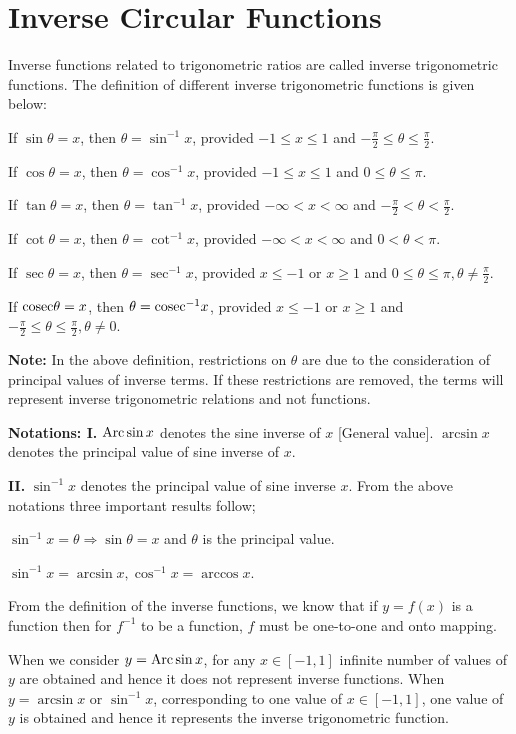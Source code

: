 \chapter{Inverse Circular Functions}
Inverse functions related to trigonometric ratios are called inverse trigonometric functions. The definition of different
inverse trigonometric functions is given below:

If $\sin\theta = x$, then $\theta = \sin^{-1}x$, provided $-1\leq x\leq 1$ and $-\frac{\pi}{2}\leq\theta\leq\frac{\pi}{2}$.

If $\cos\theta = x$, then $\theta = \cos^{-1}x$, provided $-1\leq x\leq 1$ and $0\leq\theta\leq\pi$.

If $\tan\theta = x$, then $\theta = \tan^{-1}x$, provided $-\infty<x<\infty$ and $-\frac{\pi}{2}<\theta<\frac{\pi}{2}$.

If $\cot\theta = x$, then $\theta = \cot^{-1}x$, provided $-\infty<x<\infty$ and $0<\theta<\pi$.

If $\sec\theta = x$, then $\theta = \sec^{-1}x$, provided $x\leq -1$ or $x\geq 1$ and $0\leq \theta\leq
\pi,\theta\neq\frac{\pi}{2}$.

If ${\rm cosec}\theta = x$, then $\theta = {\rm cosec}^{-1}x$, provided $x\leq -1$ or $x\geq 1$ and $-\frac{\pi}{2}\leq\theta\leq
\frac{\pi}{2}, \theta\neq0$.

{\bf Note:} In the above definition, restrictions on $\theta$ are due to the consideration of principal values of inverse
terms. If these restrictions are removed, the terms will represent inverse trigonometric relations and not functions.

{\bf Notations: I.} ${\rm Arc}\sin x$ denotes the sine inverse of $x$ [General value]. $\arcsin x$ denotes the principal value
of sine inverse of $x$.

{\bf II.} $\sin^{-1}x$ denotes the principal value of sine inverse $x$. From the above notations three important results follow;
\startitemize[n]
\item $\sin^{-1}x = \theta \Rightarrow \sin\theta = x$ and $\theta$ is the principal value.
\item $\sin^{-1}x = \arcsin x, \cos^{-1}x = \arccos x$.
\item From the definition of the inverse functions, we know that if $y = f(x)$ is a function then for $f^{-1}$ to be a function,
  $f$ must be one-to-one and onto mapping.
\stopitemize

When we consider $y = {\rm Arc}\sin x$, for any $x\in[-1, 1]$ infinite number of values of $y$ are obtained and hence it does not
represent inverse functions. When $y = \arcsin x$ or $\sin^{-1}x$, corresponding to one value of $x\in[-1, 1]$, one value of $y$ is
obtained and hence it represents the inverse trigonometric function.

